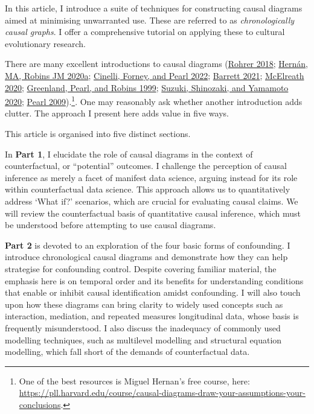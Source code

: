 \documentclass[
  singlecolumn]{report}
\begin{document}
In this article, I introduce a suite of techniques for constructing
causal diagrams aimed at minimising unwarranted use. These are referred
to as \emph{chronologically causal graphs}. I offer a comprehensive
tutorial on applying these to cultural evolutionary research.

There are many excellent introductions to causal diagrams
(\protect\hyperlink{ref-rohrer2018}{Rohrer 2018};
\protect\hyperlink{ref-hernuxe1nmarobinsjm2020}{Hernán, MA, Robins JM
2020a}; \protect\hyperlink{ref-cinelli2022}{Cinelli, Forney, and Pearl
2022}; \protect\hyperlink{ref-barrett2021}{Barrett 2021};
\protect\hyperlink{ref-mcelreath2020}{McElreath 2020};
\protect\hyperlink{ref-greenland1999}{Greenland, Pearl, and Robins
1999}; \protect\hyperlink{ref-suzuki2020}{Suzuki, Shinozaki, and
Yamamoto 2020}; \protect\hyperlink{ref-pearl2009}{Pearl
2009}).\footnote{One of the best resources is Miguel Hernan's free
  course, here:
  \url{https://pll.harvard.edu/course/causal-diagrams-draw-your-assumptions-your-conclusions}.}.
One may reasonably ask whether another introduction adds clutter. The
approach I present here adds value in five ways.

This article is organised into five distinct sections.

In \textbf{Part 1}, I elucidate the role of causal diagrams in the
context of counterfactual, or ``potential'' outcomes. I challenge the
perception of causal inference as merely a facet of manifest data
science, arguing instead for its role within counterfactual data
science. This approach allows us to quantitatively address `What if?'
scenarios, which are crucial for evaluating causal claims. We will
review the counterfactual basis of quantitative causal inference, which
must be understood before attempting to use causal diagrams.

\textbf{Part 2} is devoted to an exploration of the four basic forms of
confounding. I introduce chronological causal diagrams and demonstrate
how they can help strategise for confounding control. Despite covering
familiar material, the emphasis here is on temporal order and its
benefits for understanding conditions that enable or inhibit causal
identification amidst confounding. I will also touch upon how these
diagrams can bring clarity to widely used concepts such as interaction,
mediation, and repeated measures longitudinal data, whose basis is
frequently misunderstood. I also discuss the inadequacy of commonly used
modelling techniques, such as multilevel modelling and structural
equation modelling, which fall short of the demands of counterfactual
data.
\end{document}
